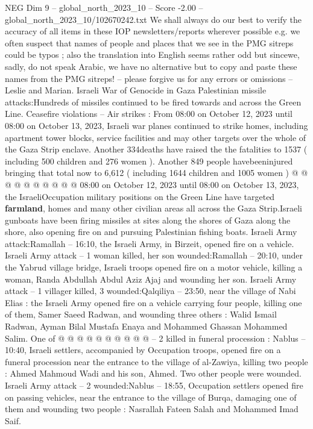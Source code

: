 \begin{textsample}{NEG Dim 9 – global\_north\_2023\_10 – Score -2.00 – global\_north\_2023\_10/102670242.txt}  \label{ex:f9_neg_150}
We shall always do our best to verify the accuracy of all items in these IOP newsletters/reports wherever possible e.g. we often suspect that names of people and places that we see in the PMG sitreps could be typos ; also the translation into English seems rather odd but sincewe, sadly, do not speak Arabic, we have no alternative but to copy and paste these names from the PMG sitreps! -- please forgive us for any errors or omissions -- Leslie and Marian.
Israeli War of Genocide in Gaza Palestinian missile attacks:Hundreds of missiles continued to be fired towards and across the Green Line.
Ceasefire violations -- Air strikes : From 08:00 on October 12, 2023 until 08:00 on October 13, 2023, Israeli war planes continued to strike homes, including apartment tower blocks, service facilities and may other targets over the whole of the Gaza Strip enclave.
Another 334deaths have raised the the fatalities to 1537 ( including 500 children and 276 women ).
Another 849 people havebeeninjured bringing that total now to 6,612 ( including 1644 children and 1005 women ) @ @ @ @ @ @ @ @ @ @ 08:00 on October 12, 2023 until 08:00 on October 13, 2023, the IsraeliOccupation military positions on the Green Line have targeted \textbf{farmland}, homes and many other civilian areas all across the Gaza Strip.Israeli gunboats have been firing missiles at sites along the shores of Gaza along the shore, also opening fire on and pursuing Palestinian fishing boats.
Israeli Army attack:Ramallah -- 16:10, the Israeli Army, in Birzeit, opened fire on a vehicle.
Israeli Army attack -- 1 woman killed, her son wounded:Ramallah -- 20:10, under the Yabrud village bridge, Israeli troops opened fire on a motor vehicle, killing a woman, Randa Abdullah Abdul Aziz Ajaj and wounding her son.
Israeli Army attack -- 1 villager killed, 3 wounded:Qalqiliya -- 23:50, near the village of Nabi Elias : the Israeli Army opened fire on a vehicle carrying four people, killing one of them, Samer Saeed Radwan, and wounding three others : Walid Ismail Radwan, Ayman Bilal Mustafa Enaya and Mohammed Ghassan Mohammed Salim.
One of @ @ @ @ @ @ @ @ @ @ -- 2 killed in funeral procession : Nablus -- 10:40, Israeli settlers, accompanied by Occupation troops, opened fire on a funeral procession near the entrance to the village of al-Zawiya, killing two people : Ahmed Mahmoud Wadi and his son, Ahmed.
Two other people were wounded.
Israeli Army attack -- 2 wounded:Nablus -- 18:55, Occupation settlers opened fire on passing vehicles, near the entrance to the village of Burqa, damaging one of them and wounding two people : Nasrallah Fateen Salah and Mohammed Imad Saif.

\end{textsample}
